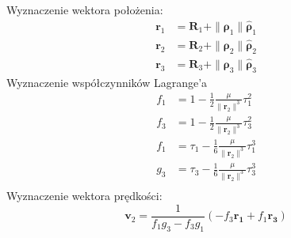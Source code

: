 Wyznaczenie wektora położenia:
\begin{align}
\mathbf{r}_1 &= \mathbf{R}_1 + \|\boldsymbol{\rho}_1\| \boldsymbol{\hat{\rho}}_1 \\
\mathbf{r}_2 &= \mathbf{R}_2 + \|\boldsymbol{\rho}_2\| \boldsymbol{\hat{\rho}}_2 \\
\mathbf{r}_3 &= \mathbf{R}_3 + \|\boldsymbol{\rho}_3\| \boldsymbol{\hat{\rho}}_3
\end{align}
Wyznaczenie współczynników Lagrange'a
\begin{align}
f_1 &= 1 - \frac{1}{2}\frac{\mu}{\|\mathbf{r}_2\|^3}\tau_1^2 \\
f_3 &= 1 - \frac{1}{2}\frac{\mu}{\|\mathbf{r}_2\|^3}\tau_3^2 \\
f_1 &= \tau_1 - \frac{1}{6}\frac{\mu}{\|\mathbf{r}_2\|^3}\tau_1^3 \\
g_3 &= \tau_3 - \frac{1}{6}\frac{\mu}{\|\mathbf{r}_2\|^3}\tau_3^3 \\
\end{align}
Wyznaczenie wektora prędkości:
\begin{equation}
\mathbf{v}_2 = \frac{1}{f_1g_3-f_3g_1}\left(-f_3\mathbf{r_1}+f_1\mathbf{r_3}\right)
\end{equation}

